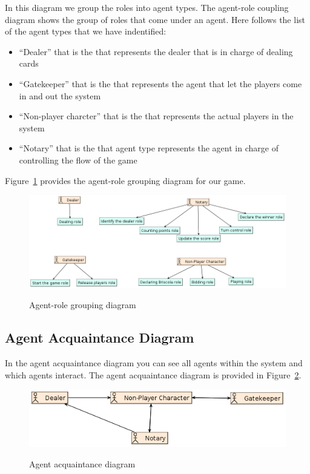 \documentclass[a4paper]{article}
\begin{document}
In this diagram we group the roles into agent types. The agent-role coupling diagram shows the group of roles that come under an agent. Here follows the list of the agent types that we have indentified:
\begin{itemize}
  \item ``Dealer'' that is the that represents the dealer that is in charge of dealing cards
  \item ``Gatekeeper'' that is the that represents the agent that let the players come in and out the system
  \item ``Non-player charcter'' that is the that represents the actual players in the system
  \item ``Notary'' that is the that agent type represents the agent in charge of controlling the flow of the game
\end{itemize}

Figure~\ref{fig:agentrole} provides the agent-role grouping diagram for our game.

\begin{figure}[htp]
  \centering
  \includegraphics[keepaspectratio,scale=0.45]{pdt/images/architectural_design/aget-role_grouping.png}
  \label{fig:agentrole}
  \caption{Agent-role grouping diagram}
\end{figure}

\subsection{Agent Acquaintance Diagram}

In the agent acquaintance diagram you can see all agents within the system and which agents interact. The agent acquaintance diagram is provided in Figure~\ref{fig:agentacq}. 

\begin{figure}[htp]
  \centering
  \includegraphics[keepaspectratio,scale=0.45]{pdt/images/architectural_design/agent_acquaintance.png}
  \label{fig:agentacq}
  \caption{Agent acquaintance diagram}
\end{figure}
\end{document}
